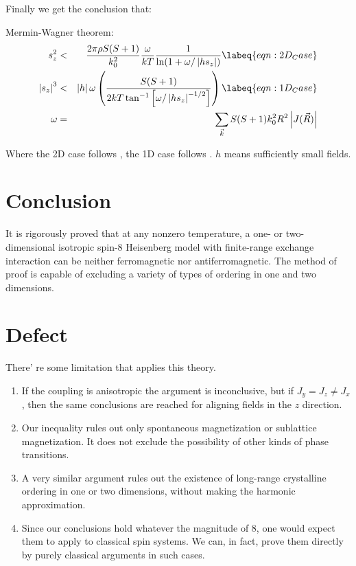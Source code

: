 Finally we get the conclusion that:
\begin{theorem}
    Mermin-Wagner theorem: \\
    \begin{eqnarray}
        s_z^2 &<& \frac{2\pi\rho S(S+1)}{k_0^2} \frac{\omega}{kT} \frac{1}{\ln(1 + \omega/ \left| h s_z \right|)} \labeq{eqn:2D_Case}\\
        \left| s_z \right|^3 &<& \left| h \right| \omega \left( \frac{S(S+1)}{2kT \tan^{-1}\left[ \omega/ \left| hs_z \right|^{-1/2} \right]} \right) \labeq{eqn:1D_Case}\\
        \omega &=& \sum_{\vec{k}} S(S+1) k_0^2 R^2 \left| J(\vec{R}) \right| \nonumber
    \end{eqnarray}
\end{theorem}
Where the 2D case follows , the 1D case follows . $h$ means sufficiently small fields.
\section{Conclusion}
It is rigorously proved that at any nonzero temperature, a one- or two-dimensional isotropic spin-8 Heisenberg model with finite-range exchange interaction can be neither ferromagnetic nor antiferromagnetic. The method of proof is capable of excluding a variety of types of ordering in one and two dimensions.

\section{Defect}
There' re some limitation that applies this theory.
\begin{enumerate}
    \item If the coupling is anisotropic the argument is inconclusive, but if $J_y = J_z \neq J_x$, then the same conclusions are reached for aligning fields in the $z$ direction.
    \item Our inequality rules out only spontaneous magnetization or sublattice magnetization. It does not exclude the possibility of other kinds of phase transitions.
    \item A very similar argument rules out the existence of long-range crystalline ordering in one or two dimensions, without making the harmonic approximation.
    \item Since our conclusions hold whatever the magnitude of 8, one would expect them to apply to classical spin systems. We can, in fact, prove them directly by purely classical arguments in such cases.
\end{enumerate}
